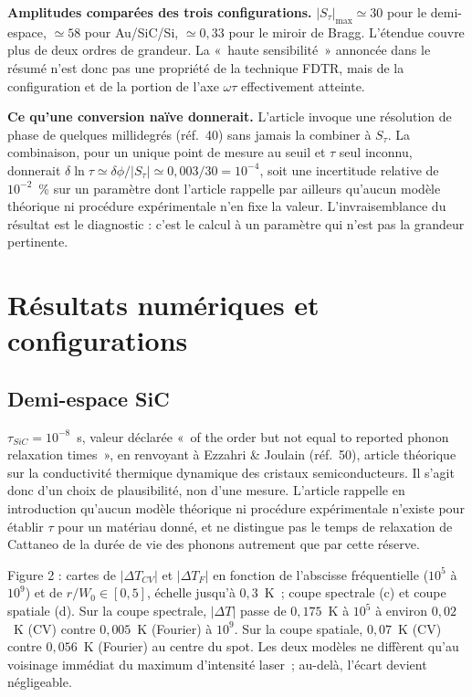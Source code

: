 \documentclass[11pt,a4paper]{article}
\begin{document}
\textbf{Amplitudes comparées des trois configurations.} $|S_\tau|_{\max} \simeq 30$ pour le
demi-espace, $\simeq 58$ pour Au/SiC/Si, $\simeq 0{,}33$ pour le miroir de Bragg. L'étendue
couvre plus de deux ordres de grandeur. La «~haute sensibilité~» annoncée dans le résumé n'est
donc pas une propriété de la technique FDTR, mais de la configuration et de la portion de l'axe
$\omega\tau$ effectivement atteinte.

\textbf{Ce qu'une conversion naïve donnerait.} L'article invoque une résolution de phase de
quelques millidegrés (réf.~40) sans jamais la combiner à $S_\tau$. La combinaison, pour un
unique point de mesure au seuil et $\tau$ seul inconnu, donnerait
$\delta\ln\tau \simeq \delta\phi/|S_\tau| \simeq 0{,}003/30 = 10^{-4}$, soit une incertitude
relative de $10^{-2}$~\% sur un paramètre dont l'article rappelle par ailleurs qu'aucun modèle
théorique ni procédure expérimentale n'en fixe la valeur. L'invraisemblance du résultat est le
diagnostic : c'est le calcul à un paramètre qui n'est pas la grandeur pertinente.

\section{Résultats numériques et configurations}

\subsection{Demi-espace SiC}

$\tau_{SiC} = 10^{-8}$~s, valeur déclarée «~of the order but not equal to reported phonon
relaxation times~», en renvoyant à Ezzahri \& Joulain (réf.~50), article théorique sur la
conductivité thermique dynamique des cristaux semiconducteurs. Il s'agit donc d'un choix de
plausibilité, non d'une mesure. L'article rappelle en introduction qu'aucun modèle théorique ni
procédure expérimentale n'existe pour établir $\tau$ pour un matériau donné, et ne distingue pas
le temps de relaxation de Cattaneo de la durée de vie des phonons autrement que par cette
réserve.

Figure 2 : cartes de $|\Delta T_{CV}|$ et $|\Delta T_F|$ en fonction de l'abscisse fréquentielle
($10^5$ à $10^9$) et de $r/W_0 \in [0,5]$, échelle jusqu'à $0{,}3$~K~; coupe spectrale (c) et
coupe spatiale (d). Sur la coupe spectrale, $|\Delta T|$ passe de $0{,}175$~K à $10^5$ à environ
$0{,}02$~K (CV) contre $0{,}005$~K (Fourier) à $10^9$. Sur la coupe spatiale, $0{,}07$~K (CV)
contre $0{,}056$~K (Fourier) au centre du spot. Les deux modèles ne diffèrent qu'au voisinage
immédiat du maximum d'intensité laser~; au-delà, l'écart devient négligeable.
\end{document}
